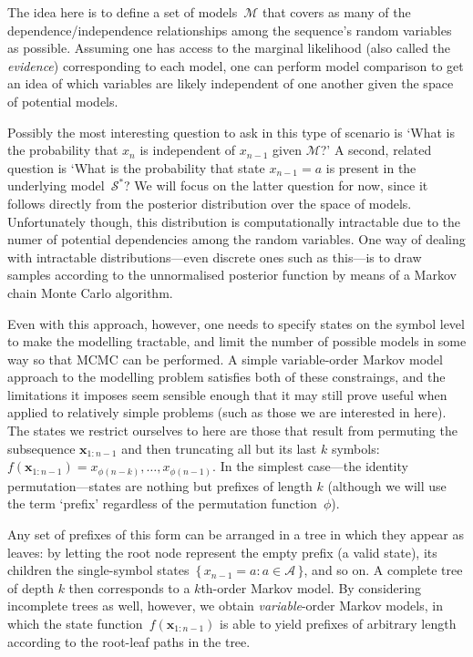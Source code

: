 \documentclass[12pt,a4paper]{article}
\newcommand\mc[1]{\mathcal{#1}}               %
\newcommand\ub[1]{\symbf{#1}}                 %
\begin{document}
The idea here is to define a set of models~\(\mc{M}\) that covers as many of the
dependence/independence relationships among the sequence's random variables as
possible. Assuming one has access to the marginal likelihood (also called the
\emph{evidence}) corresponding to each model, one can perform model comparison
to get an idea of which variables are likely independent of one another given
the space of potential models.

Possibly the most interesting question to ask in this type of scenario is `What
is the probability that \(x_n\) is independent of \(x_{n-1}\) given \(\mc{M}\)?'
A second, related question is `What is the probability that state \({x_{n-1} =
a}\) is present in the underlying model~\(\mc{S}^*\)? We will focus on the
latter question for now, since it follows directly from the posterior
distribution over the space of models. Unfortunately though, this distribution
is computationally intractable due to the numer of potential dependencies among
the random variables. One way of dealing with intractable distributions---even
discrete ones such as this---is to draw samples according to the unnormalised
posterior function by means of a Markov chain Monte Carlo algorithm.

Even with this approach, however, one needs to specify states on the symbol
level to make the modelling tractable, and limit the number of possible models
in some way so that MCMC can be performed. A simple variable-order Markov model
approach to the modelling problem satisfies both of these constraings, and the
limitations it imposes seem sensible enough that it may still prove useful when
applied to relatively simple problems (such as those we are interested in here).
The states we restrict ourselves to here are those that result from permuting
the subsequence \(\ub{x}_{1:n-1}\) and then truncating all but its last \(k\)
symbols:~\(f(\ub{x}_{1:n-1}) = x_{\phi(n-k)}, \dots, x_{\phi(n-1)}\). In the
simplest case---the identity permutation---states are nothing but prefixes of
length \(k\) (although we will use the term `prefix' regardless of the
permutation function~\(\phi\)).

Any set of prefixes of this form can be arranged in a tree in which they appear
as leaves: by letting the root node represent the empty prefix (a valid state),
its children the single-symbol states~\({\{\,x_{n-1} = a : a \in \mc{A}\,\}}\),
and so on. A complete tree of depth \(k\) then corresponds to a \(k\)th-order
Markov model. By considering incomplete trees as well, however, we obtain
\emph{variable}-order Markov models, in which the state
function~\(f(\ub{x}_{1:n-1})\) is able to yield prefixes of arbitrary length
according to the root-leaf paths in the tree.
\end{document}
